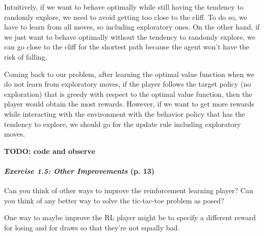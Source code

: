 \documentclass[10pt,a4paper]{article}
\begin{document}
Intuitively, if we want to behave optimally while still having the tendency to randomly explore, we need to avoid getting too close to the cliff. To do so, we have to learn from all moves, so including exploratory ones. On the other hand, if we just want to behave optimally without the tendency to randomly explore, we can go close to the cliff for the shortest path because the agent won't have the risk of falling.

Coming back to our problem, after learning the optimal value function when we do not learn from exploratory moves, if the player follows the target policy (no exploration) that is greedy with respect to the optimal value function, then the player would obtain the most rewards. However, if we want to get more rewards while interacting with the environment with the behavior policy that has the tendency to explore, we should go for the update rule including exploratory moves.


%

\textbf{TODO: code and observe}

\paragraph{\textit{Exercise 1.5: Other Improvements} (p. 13)} Can you think of other ways to improve the reinforcement learning player? Can you think of any better way to solve the tic-tac-toe problem as posed?

\bigskip
One way to maybe improve the RL player might be to specify a different reward for losing and for draws so that they're not equally bad.
\end{document}
